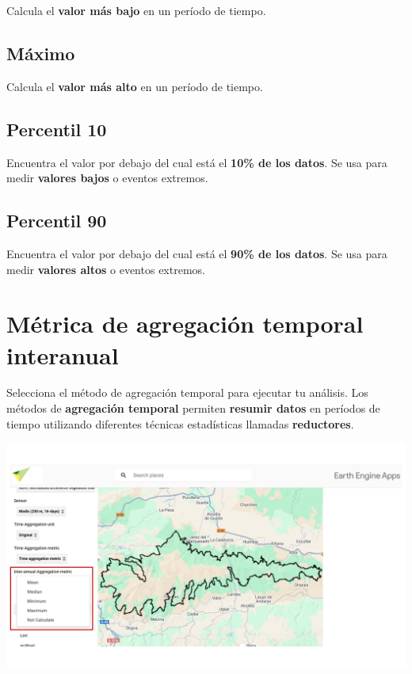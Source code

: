 \documentclass[
]{book}
\begin{document}
Calcula el \textbf{valor más bajo} en un período de tiempo.

\section{\texorpdfstring{\textbf{Máximo}}{Máximo}}\label{muxe1ximo}

Calcula el \textbf{valor más alto} en un período de tiempo.

\section{\texorpdfstring{\textbf{Percentil 10}}{Percentil 10}}\label{percentil-10}

Encuentra el valor por debajo del cual está el \textbf{10\% de los datos}. Se usa para medir \textbf{valores bajos} o eventos extremos.

\section{\texorpdfstring{\textbf{Percentil 90}}{Percentil 90}}\label{percentil-90}

Encuentra el valor por debajo del cual está el \textbf{90\% de los datos}. Se usa para medir \textbf{valores altos} o eventos extremos.

\chapter{Métrica de agregación temporal interanual}\label{agregacion-temporal-interanual}

Selecciona el método de agregación temporal para ejecutar tu análisis. Los métodos de \textbf{agregación temporal} permiten \textbf{resumir datos} en períodos de tiempo utilizando diferentes técnicas estadísticas llamadas \textbf{reductores}.

\includegraphics{assets/interannualAggregation.png}
\end{document}
